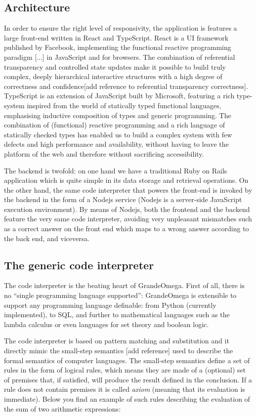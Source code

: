 \subsection{Architecture}
In order to ensure the right level of responsivity, the application is features a large front-end written in React and TypeScript. React is a UI framework published by Facebook, implementing the functional reactive programming paradigm [...] in JavaScript and for browsers. The combination of referential transparency and controlled state updates make it possible to build truly complex, deeply hierarchical interactive structures with a high degree of correctness and confidence[add reference to referential transparency correctness]. TypeScript is an extension of JavaScript built by Microsoft, featuring a rich type-system inspired from the world of statically typed functional languages, emphasising inductive composition of types and generic programming. The combination of (functional) reactive programming and a rich language of statically checked types has enabled us to build a complex system with few defects and high performance and availability, without having to leave the platform of the web and therefore without sacrificing accessibility.


The backend is twofold: on one hand we have a traditional Ruby on Rails application which is quite simple in its data storage and retrieval operations. On the other hand, the same code interpreter that powers the front-end is invoked by the backend in the form of a Nodejs service (Nodejs is a server-side JavaScript execution environment). By means of Nodejs, both the frontend and the backend feature the very same code interpreter, avoiding very unpleasant mismatches such as a correct answer on the front end which maps to a wrong answer according to the back end, and viceversa.

\subsection{The generic code interpreter}
The code interpreter is the beating heart of GrandeOmega. First of all, there is no “single programming language supported”: GrandeOmega is extensible to support any programming language definable: from Python (currently implemented), to SQL, and further to mathematical languages such as the lambda calculus or even languages for set theory and boolean logic.

The code interpreter is based on pattern matching and substitution and it directly mimic the small-step semantics [add reference] used to describe the formal semantics of computer languages. The small-step semantics define a set of rules in the form of logical rules, which means they are made of a (optional) set of premises that, if satisfied, will produce the result defined in the conclusion. If a rule does not contain premises it is called \textit{axiom} (meaning that its evaluation is immediate). Below you find an example of such rules describing the evaluation of the sum of two arithmetic expressions:

